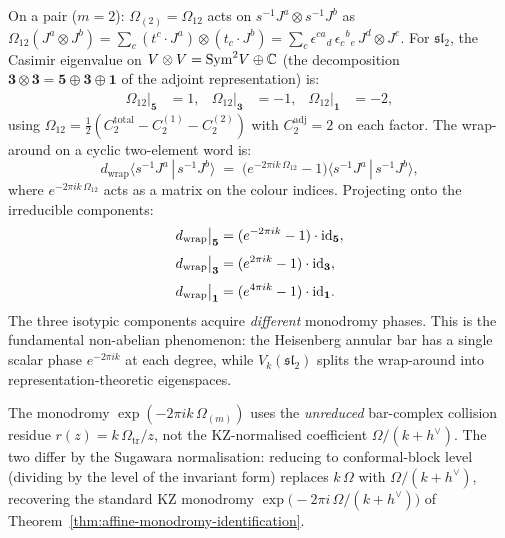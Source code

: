\begin{computation}
\begin{enumerate}[label=\textup{(\alph*)}]
 On a pair ($m=2$): $\Omega_{(2)} = \Omega_{12}$
 acts on $s^{-1}J^a \otimes s^{-1}J^b$ as
 $\Omega_{12}(J^a \otimes J^b) = \sum_c
 (t^c \cdot J^a) \otimes (t_c \cdot J^b)
 = \sum_c \epsilon^{ca}{}_d\, \epsilon_{c}{}^{b}{}_e\,
 J^d \otimes J^e$.
 For $\mathfrak{sl}_2$, the Casimir eigenvalue on
 $V \otimes V = \mathrm{Sym}^2 V \oplus \mathbb{C}$
 (the decomposition $\mathbf{3} \otimes \mathbf{3}
 = \mathbf{5} \oplus \mathbf{3} \oplus \mathbf{1}$
 of the adjoint representation) is:
 \begin{align}
 \Omega_{12}\big|_{\mathbf{5}} &= 1,
 &
 \Omega_{12}\big|_{\mathbf{3}} &= -1,
 &
 \Omega_{12}\big|_{\mathbf{1}} &= -2,
 \label{eq:sl2-casimir-eigenvalues}
 \end{align}
 using $\Omega_{12} = \tfrac{1}{2}(C_2^{\mathrm{total}}
 - C_2^{(1)} - C_2^{(2)})$ with $C_2^{\mathrm{adj}} = 2$
 on each factor.
 The wrap-around on a cyclic two-element word is:
 \begin{equation}\label{eq:sl2-ann-wrap-2}
 d_{\mathrm{wrap}}
 \langle s^{-1}J^a\,|\,s^{-1}J^b\rangle
 \;=\;
 \bigl(
 e^{-2\pi ik\,\Omega_{12}} - 1
 \bigr)
 \langle s^{-1}J^a\,|\,s^{-1}J^b\rangle,
 \end{equation}
 where $e^{-2\pi ik\,\Omega_{12}}$ acts as a
 matrix on the colour indices.
 Projecting onto the irreducible components:
 \begin{align}
 d_{\mathrm{wrap}}\big|_{\mathbf{5}}
 &= (e^{-2\pi ik} - 1) \cdot \mathrm{id}_{\mathbf{5}},
 \notag \\[3pt]
 d_{\mathrm{wrap}}\big|_{\mathbf{3}}
 &= (e^{2\pi ik} - 1) \cdot \mathrm{id}_{\mathbf{3}},
 \label{eq:sl2-ann-wrap-isotypic}\\[3pt]
 d_{\mathrm{wrap}}\big|_{\mathbf{1}}
 &= (e^{4\pi ik} - 1) \cdot \mathrm{id}_{\mathbf{1}}.
 \notag
 \end{align}
 The three isotypic components acquire \emph{different}
 monodromy phases. This is the fundamental
 non-abelian phenomenon: the Heisenberg annular bar
 has a single scalar phase $e^{-2\pi ik}$ at each
 degree, while $V_k(\mathfrak{sl}_2)$ splits the
 wrap-around into representation-theoretic eigenspaces.

 The monodromy $\exp(-2\pi ik\,\Omega_{(m)})$ uses the
 \emph{unreduced} bar-complex collision residue
 $r(z) = k\,\Omega_{\mathrm{tr}}/z$, not the KZ-normalised coefficient
 $\Omega/(k+h^\vee)$. The two differ by the Sugawara
 normalisation: reducing to conformal-block level
 (dividing by the level of the invariant form) replaces
 $k\,\Omega$ with $\Omega/(k+h^\vee)$, recovering
 the standard KZ monodromy
 $\exp\!\bigl({-}2\pi i\,\Omega/(k+h^\vee)\bigr)$
 of Theorem~\textup{\ref{thm:affine-monodromy-identification}}.
\end{enumerate}


\end{computation}
